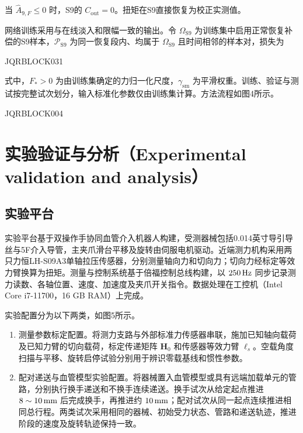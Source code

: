 当 $\widehat A_{9,F}\le0$ 时，S9的 $C_{\mathrm{out}}=0$。扭矩在S9直接恢复为校正实测值。





网络训练采用与在线淡入和限幅一致的输出。令 $\Omega_{\mathrm{S9}}$ 为训练集中启用正常恢复补偿的S9样本，$\mathcal P_{\mathrm{S9}}$ 为同一恢复段内、均属于 $\Omega_{\mathrm{S9}}$ 且时间相邻的样本对，损失为


JQRBLOCK031


式中，$F_*>0$ 为由训练集确定的力归一化尺度，$\gamma_{\mathrm{sm}}$ 为平滑权重。训练、验证与测试按完整试次划分，输入标准化参数仅由训练集计算。方法流程如图4所示。







JQRBLOCK004






\section{实验验证与分析（Experimental validation and analysis）}

\subsection{实验平台}


实验平台基于双操作手协同血管介入机器人构建，受测器械包括0.014英寸导引导丝与5F介入导管，主夹爪滑台平移及旋转由伺服电机驱动。近端测力机构采用两只力恒LH-S09A3单轴拉压传感器，分别测量轴向力和切向力；切向力经标定等效力臂换算为扭矩。测量与控制系统基于倍福控制总线构建，以 $250\,{\rm Hz}$ 同步记录测力读数、各轴位置、速度、加速度及夹爪开关指令。数据处理在工控机（Intel Core i7-11700，16 GB RAM）上完成。





实验配置分为以下两类，如图5所示。
\begin{enumerate}
\item 测量参数标定配置。将测力支路与外部标准力传感器串联，施加已知轴向载荷及已知力臂的切向载荷，标定传递矩阵 $\bm H_0$ 和传感器等效力臂 $\ell_s$。空载角度扫描与平移、旋转启停试验分别用于辨识零载基线和惯性参数。
\item 配对递送与血管模型实验配置。将器械置入血管模型或具有远端加载单元的管路，分别执行换手递送和不换手连续递送。换手试次从给定起点推进 $8\sim10\,{\rm mm}$ 后完成换手，再推进约 $10\,{\rm mm}$；配对试次从同一起点连续推进相同总行程。两类试次采用相同的器械、初始受力状态、管路和递送轨迹，推进阶段的速度及旋转轨迹保持一致。
\end{enumerate}





